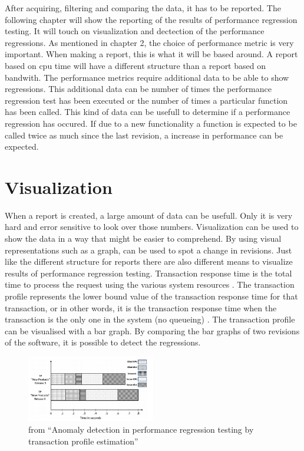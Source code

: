 After acquiring, filtering and comparing the data, it has to be reported. The following chapter will show the reporting of the results of performance regression testing. It will touch on visualization and dectection of the performance regressions. \newline
\newline
As mentioned in chapter 2, the choice of performance metric is very important. When making a report, this is what it will be based around. A report based on cpu time will have a different structure than a report based on bandwith. The performance metrics require additional data to be able to show regressions. This additional data can be number of times the performance regression test has been executed or the number of times a particular function has been called. This kind of data can be usefull to determine if a performance regression has occured. If due to a new functionality a function is expected to be called twice as much since the last revision, a increase in performance can be expected.\newline

\section{Visualization}
When a report is created, a large amount of data can be usefull. Only it is very hard and error sensitive to look over those numbers. Visualization can be used to show the data in a way that might be easier to comprehend. By using visual representations such as a graph, can be used to spot a change in revisions. Just like the different structure for reports there are also different means to visualize results of performance regression testing.\newline
Transaction response time is the total time to process the request using the various
system resources \cite{jain2008art}. The transaction profile represents the lower bound value of the transaction response time for that transaction, or in other words, it is the
transaction response time when the transaction is the only one in the system (no queueing) \cite{ghaith2015anomaly}.\newline
The transaction profile can be visualised with a bar graph. By comparing the bar graphs of two revisions of the software, it is possible to detect the regressions.

\begin{figure}[h]
\begin{center}
  \includegraphics[width=0.5\textwidth]{Figures/TP.PNG}
\end{center}
  \caption{from ``Anomaly detection in performance regression testing by transaction profile estimation''\cite{ghaith2015anomaly}}

\end{figure}

